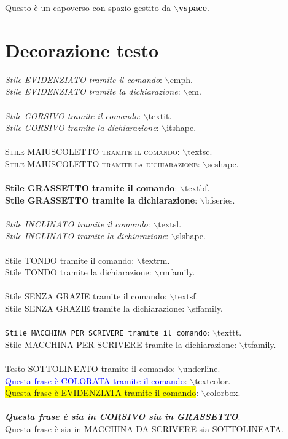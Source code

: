 \documentclass[a4paper,12pt,oneside]{book}
\theoremstyle{plain}
\begin{document}
	\vspace{15pt} Questo è un capoverso con spazio gestito da \textbf{$\backslash$vspace}.
	
	
	\section{Decorazione testo}\label{sec:testo}
	\emph{Stile EVIDENZIATO tramite il comando}: $\backslash$emph.\\
	{\em Stile EVIDENZIATO tramite la dichiarazione}: $\backslash$em.\\
	\\
	\textit{Stile CORSIVO tramite il comando}: $\backslash$textit.\\
	{\itshape Stile CORSIVO tramite la dichiarazione}: $\backslash$itshape.\\
	\\
	\textsc{Stile MAIUSCOLETTO tramite il comando}: $\backslash$textsc.\\
	{\scshape Stile MAIUSCOLETTO tramite la dichiarazione}: $\backslash$scshape.\\
	\\
	\textbf{Stile GRASSETTO tramite il comando}: $\backslash$textbf.\\
	{\bfseries Stile GRASSETTO tramite la dichiarazione}: $\backslash$bfseries.\\
	\\
	\textsl{Stile INCLINATO tramite il comando}: $\backslash$textsl.\\
	{\slshape Stile INCLINATO tramite la dichiarazione}: $\backslash$slshape.\\
	\\
	\textrm{Stile TONDO tramite il comando}: $\backslash$textrm.\\
	{\rmfamily Stile TONDO tramite la dichiarazione}: $\backslash$rmfamily.\\
	\\
	\textsf{Stile SENZA GRAZIE tramite il comando}: $\backslash$textsf.\\
	{\sffamily Stile SENZA GRAZIE tramite la dichiarazione}: $\backslash$sffamily.\\
	\\
	\texttt{Stile MACCHINA PER SCRIVERE tramite il comando}: $\backslash$texttt.\\
	{\ttfamily Stile MACCHINA PER SCRIVERE tramite la dichiarazione}: $\backslash$ttfamily.\\
	\\
	\underline{Testo SOTTOLINEATO tramite il comando}: $\backslash$underline.\\
	\textcolor{blue}{Questa frase è COLORATA tramite il comando}: $\backslash$textcolor.\\
	\colorbox{yellow}{Questa frase è EVIDENZIATA tramite il comando}: $\backslash$colorbox.\\
	\\
	\textit{\textbf{Questa frase è sia in CORSIVO sia in GRASSETTO}}.\\
	\underline{{\ttfamily Questa frase è sia in MACCHINA DA SCRIVERE sia SOTTOLINEATA}}.
	
\end{document}

